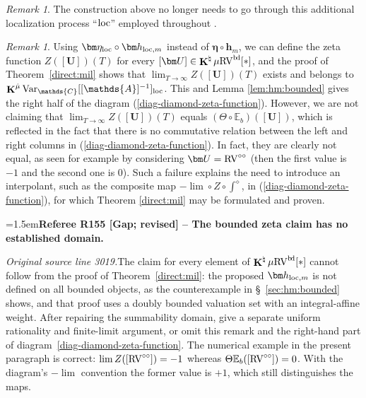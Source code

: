 \documentclass[12pt]{amsart}
\newcommand{\RefereeRemark}[4]{%
  \par\medskip\begingroup\normalfont\small\color{RefereePurple}%
  \emergencystretch=1.5em\noindent\textbf{Referee R#1 [#2] -- #3.}\par\nobreak\noindent #4\par
  \endgroup\medskip
}
\theoremstyle{plain}
\theoremstyle{definition}
\theoremstyle{remark}
\newtheorem{rem}[thm]{Remark}
\numberwithin{equation}{section}
\theoremstyle{plain}
\newcommand{\RV}{\textup{RV}}
\newcommand{\A}{\mathds{A}}
\newcommand{\C}{\mathds{C}}
\newcommand{\0}{\emptyset}
\newcommand{\bb}[1]{\mathbb{#1}}
\newcommand{\limplies}{\rightarrow}
\newcommand{\mgRV}{{\mu}{\RV}}
\DeclareMathOperator{\ggk}{\mathbf{K}}
\DeclareMathOperator{\bdd}{b \! d}
\newcommand{\var}{\textup{Var}}
\newcommand{\loc}{\textup{loc}}
\newcommand{\gmv}{\ggk^{\hat \mu}\var_{\C}}
\begin{document}
\begin{rem}
The construction above no longer needs to go through this additional localization process ``$\loc$'' employed throughout \cite[\S~8]{hru:loe:lef}.
\end{rem}


\begin{rem}
Using $\bm \eta_{\loc} \circ \bm h_{\loc,m}$ instead of $\bm \eta \circ \bm h_m$, we can define the zeta function $Z([\bm U])(T)$ for every $[\bm U] \in \ggk^\natural \mgRV^{\bdd}[*]$, and the proof of Theorem~\ref{direct:mil} shows that $\lim_{T \limplies \infty} Z([\bm U])(T)$ exists and belongs to $\gmv[[\A]^{-1}]_{\loc}$. This and  Lemma \ref{lem:hm:bounded} gives the right half of the diagram (\ref{diag-diamond-zeta-function}). However,  we are not  claiming  that $\lim_{T \limplies \infty} Z([\bm U])(T)$ equals $(\Theta \circ \bb E_b)( [\bm U])$, which is reflected in the fact that there is no commutative relation between the left and right columns in (\ref{diag-diamond-zeta-function}). In fact, they are clearly not equal, as seen for example by considering $\bm U = \RV^{\circ\circ}$ (then the first value is $-1$ and the second one is $0$).  Such a failure explains the need to introduce an interpolant, such as the composite map $- \lim \circ Z \circ \int^\diamond$, in (\ref{diag-diamond-zeta-function}), for which Theorem \ref{direct:mil} may be formulated and proven.

\RefereeRemark{155}{Gap; revised}{The bounded zeta claim has no established domain}{%
\textit{Original source line 3019.}\quad The claim for every element of $\ggk^\natural\mgRV^{\bdd}[*]$ cannot follow from the proof of Theorem~\ref{direct:mil}: the proposed $\bm h_{\loc,m}$ is not defined on all bounded objects, as the counterexample in \S~\ref{sec:hm:bounded} shows, and that proof uses a doubly bounded valuation set with an integral-affine weight. After repairing the summability domain, give a separate uniform rationality and finite-limit argument, or omit this remark and the right-hand part of diagram~\eqref{diag-diamond-zeta-function}. The numerical example in the present paragraph is correct: $\lim Z([\RV^{\circ\circ}])=-1$ whereas $\Theta\bb E_b([\RV^{\circ\circ}])=0$. With the diagram's $-\lim$ convention the former value is $+1$, which still distinguishes the maps.
}
\end{rem}
\end{document}
